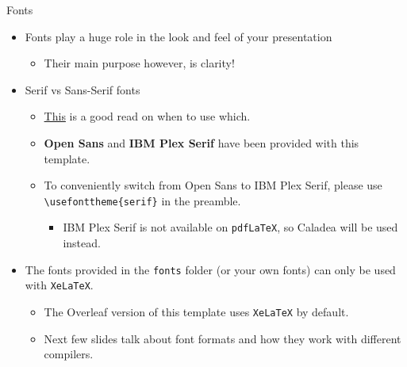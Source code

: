 \documentclass{beamer}
\newcommand{\hrefcol}[2]{\textcolor{gtbuzzgold}{\href{#1}{#2}}}
\begin{document}


\begin{frame}[fragile]{Fonts}
\begin{itemize}
\item Fonts play a huge role in the look and feel of your presentation
  \begin{itemize}
  \item Their main purpose however, is clarity!
  \end{itemize}
\item \textrm{Serif} vs \textsf{Sans-Serif} fonts
  \begin{itemize}
  \item \hrefcol{https://www.adobe.com/creativecloud/design/discover/serif-vs-sans-serif.html}{This} is a good read on when to use which.
  \item \textbf{Open Sans} and \textbf{IBM Plex Serif} have been provided with this template.
  \item To conveniently switch from Open Sans to IBM Plex Serif, please use \verb|\usefonttheme{serif}| in the preamble.
    \begin{itemize}
    \item IBM Plex Serif is not available on \verb|pdfLaTeX|, so Caladea will be used instead.
    \end{itemize}
  \end{itemize}
\item The fonts provided in the \verb|fonts| folder (or your own fonts) can only be used with \verb|XeLaTeX|.
    \begin{itemize}
    \item The Overleaf version of this template uses \verb|XeLaTeX| by default.
    \item Next few slides talk about font formats and how they work with different compilers.
    \end{itemize}
\end{itemize}
\end{frame}
\end{document}
